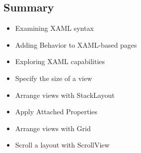 \documentclass{article}
\begin{document}
\subsection{Summary}

\begin{itemize}
    \item Examining XAML syntax
    \item Adding Behavior to XAML-based pages
    \item Exploring XAML capabilities
    \item Specify the size of a view
    \item Arrange views with StackLayout
    \item Apply Attached Properties
    \item Arrange views with Grid
    \item Scroll a layout with ScrollView
\end{itemize}
\end{document}
